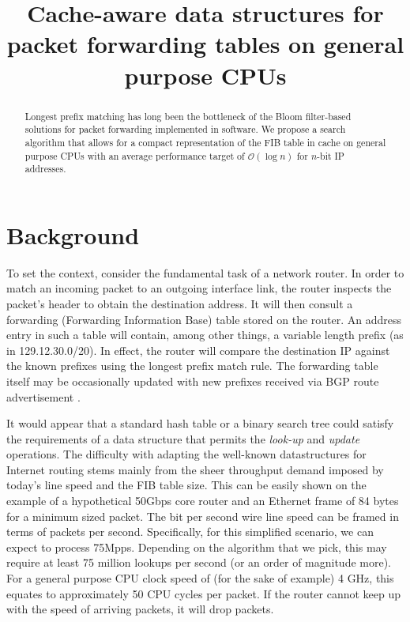 \documentclass[conference,compsoc]{IEEEtran}
\begin{document}
\title{Cache-aware data structures for packet forwarding tables on general purpose CPUs}
\author{
}

\maketitle

\begin{abstract}
Longest prefix matching has long been the bottleneck of the Bloom 
filter-based solutions for packet forwarding implemented in software. We propose
a search algorithm that allows for a compact representation of the FIB table
in cache on general purpose CPUs with an average performance target
of $\mathcal{O}(\log n)$ for $n$-bit IP addresses.

\end{abstract}

\section{Background}
To set the context, consider the fundamental task of a network router.
In order to match an incoming packet to an outgoing interface link,
the router inspects the packet's header to obtain the destination address.
It will then consult a forwarding (Forwarding Information Base) table 
stored on the router.
An address entry in such a table will contain, among other things,
a variable length prefix (as in 129.12.30.0/20).
In effect, the router will compare the destination IP
against the known prefixes using the longest prefix match rule.
The forwarding table itself may be occasionally updated with new prefixes
received via BGP route advertisement \cite{Kurose:Networking}.

It would appear that a standard hash table or a binary search tree could
satisfy the requirements of a data structure that permits the 
\textit{look-up} and \textit{update} operations. The difficulty with 
adapting the well-known 
datastructures for Internet routing stems mainly from the sheer throughput
demand imposed by today's line speed and the FIB table size.
This can be easily shown on the example of a hypothetical 50Gbps core router 
and an Ethernet frame of 84 bytes for a minimum sized packet. 
The bit per second 
wire line speed can be framed in terms of packets per second. Specifically,
for this simplified scenario, we can expect to process 75Mpps. Depending on
the algorithm that we pick, this may require at least 75 million lookups 
per second (or an order of magnitude more). For a general purpose CPU clock
speed of (for the sake of example) 4 GHz, this equates to approximately 
50 CPU cycles per packet. If the router cannot keep up with the speed of
arriving packets, it will drop packets.
\end{document}
